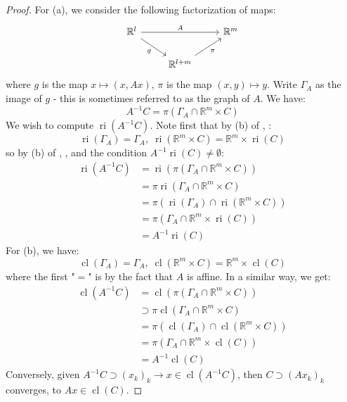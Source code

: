 \begin{proof}
	For (a), we consider the following factorization of maps:
	\[
		\begin{tikzcd}
			\mathbb{R}^l \arrow[rr,"A"]\arrow[dr,swap,"g"] &&\mathbb{R}^{m}\\
			&\mathbb{R}^{l+m}\arrow[ru,swap,"\pi"]&
		\end{tikzcd}
	\]
	where $g$ is the map $x\mapsto (x,Ax)$, $\pi$ is the map $(x, y)\mapsto y$. Write $\Gamma_A$ as the image of $g$ - this is sometimes referred to as the graph of $A$. We have:
	\[
		A^{-1}C=\pi (\Gamma_A\cap \mathbb{R}^m\times C)
	\]
	We wish to compute $\operatorname{ri}(A^{-1}C)$. Note first that by (b) of , :
	\[
		\operatorname{ri}(\Gamma_A)=\Gamma_A,\; \operatorname{ri}(\mathbb{R}^m\times C)= \mathbb{R}^m \times \operatorname{ri}(C)
	\]
	so by (b) of , , and the condition $A^{-1}\operatorname{ri}(C)\neq\emptyset$:
	\begin{align*}
		\operatorname{ri}(A^{-1}C) & =\operatorname{ri}(\pi (\Gamma_A\cap \mathbb{R}^m\times C))                      \\
		                           & =\pi \operatorname{ri}(\Gamma_A\cap \mathbb{R}^m\times C)                        \\
		                           & =\pi (\operatorname{ri}( \Gamma_A )\cap \operatorname{ri}(\mathbb{R}^m\times C)) \\
		                           & =\pi ( \Gamma_A \cap \mathbb{R}^m\times \operatorname{ri}(C))                    \\
		                           & =A^{-1}\operatorname{ri}(C)
	\end{align*}
	For (b), we have:
	\[
		\operatorname{cl}(\Gamma_A)=\Gamma_A,\; \operatorname{cl}(\mathbb{R}^m\times C)= \mathbb{R}^m \times \operatorname{cl}(C)
	\]
	where the first "$=$" is by the fact that $A$ is affine. In a similar way, we get:
	\begin{align*}
		\operatorname{cl}(A^{-1}C) & =\operatorname{cl}(\pi (\Gamma_A\cap \mathbb{R}^m\times C))                      \\
		                           & \supset\pi \operatorname{cl}(\Gamma_A\cap \mathbb{R}^m\times C)                  \\
		                           & =\pi (\operatorname{cl}( \Gamma_A )\cap \operatorname{cl}(\mathbb{R}^m\times C)) \\
		                           & =\pi ( \Gamma_A \cap \mathbb{R}^m\times \operatorname{cl}(C))                    \\
		                           & =A^{-1}\operatorname{cl}(C)
	\end{align*}
	Conversely, given $A^{-1}C\supset (x_k)_k\to x\in \operatorname{cl}(A^{-1}C)$, then $C\supset (Ax_k)_k$ converges, to $Ax\in \operatorname{cl}(C)$.
\end{proof}

